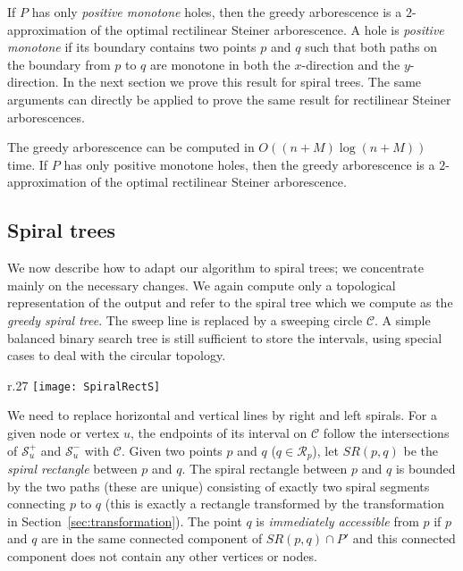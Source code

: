 \documentclass{journalA4}
\begin{document}
If $P$ has only \emph{positive monotone} holes, then the greedy arborescence is a $2$-approximation of the optimal rectilinear Steiner arborescence. A hole is
\emph{positive monotone} if its boundary contains two points $p$ and $q$ such that both paths on the boundary from $p$ to $q$ are monotone in both the $x$-direction and the $y$-direction. In the next section we prove this result for spiral trees. The same arguments can directly be applied to prove the same result for rectilinear Steiner arborescences.

\begin{theorem}
\label{lem:MSA}
The greedy arborescence can be computed in $O((n+M) \log(n+M))$ time. If $P$ has only positive monotone holes, then the greedy arborescence is a $2$-approximation of the optimal rectilinear Steiner arborescence.
\end{theorem}

\subsection{Spiral trees} \label{sec:spirobstacles}

We now describe how to adapt our algorithm to spiral trees; we concentrate mainly on the necessary changes.
We again compute only a topological representation of the output and refer to the spiral tree which we compute as the \emph{greedy spiral tree}. The sweep line is replaced by a sweeping circle $\mathcal{C}$. A simple balanced binary search tree is still sufficient to store the intervals, using special cases to deal with the circular topology.

\begin{wrapfigure}[6]{r}{.27\textwidth}
  \centering
  \texttt{[image: SpiralRectS]}
\end{wrapfigure}
We need to replace horizontal and vertical lines by right and left spirals. For a given node or vertex $u$, the endpoints of its interval on $\mathcal{C}$ follow the intersections
of $\mathcal{S}^{+}_u$ and $\mathcal{S}^{-}_u$ with $\mathcal{C}$. Given two points $p$ and $q$ ($q \in \mathcal{R}_p$), let $SR(p,q)$ be the \emph{spiral rectangle} between $p$
and $q$. The spiral rectangle between $p$ and $q$ is bounded by the two paths (these are unique) consisting of exactly two spiral segments connecting $p$ to $q$ (this is exactly a
rectangle transformed by the transformation in Section~\ref{sec:transformation}). The point $q$ is \emph{immediately accessible} from $p$ if $p$ and $q$ are in the same connected
component of $SR(p, q) \cap P'$ and this connected component does not contain any other vertices or nodes.
\end{document}
